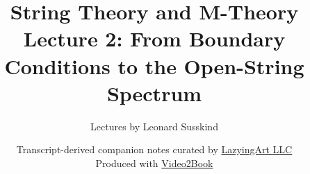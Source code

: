 \documentclass[11pt,oneside]{book}
\begin{document}
\hypersetup{pageanchor=false}
\frontmatter
\title{String Theory and M-Theory\\[0.45em]
\large Lecture 2: From Boundary Conditions to the Open-String Spectrum}
\author{Lectures by Leonard Susskind}
\date{Transcript-derived companion notes curated by
\href{https://lazying.art}{LazyingArt LLC}\\[0.35em]
\small Produced with
\href{https://github.com/lachlanchen/Video2Book}{Video2Book}}
\maketitle
\hypersetup{pageanchor=true}
\mainmatter

\end{document}
